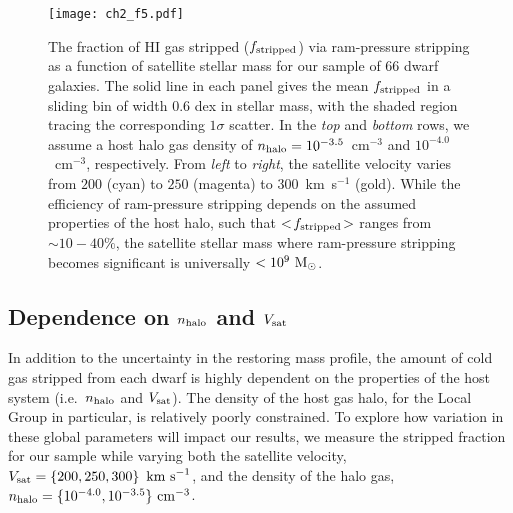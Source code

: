 
\begin{figure*}
 \centering
 \hspace*{-0.5in}
  \texttt{[image: ch2\_f5.pdf]}
  \caption{The fraction of H{\scriptsize I} gas stripped ($f_{\rm
      stripped}$) via ram-pressure %
    stripping as a function of satellite stellar mass for our sample
    of $66$ dwarf galaxies. The solid line in each panel gives the
    mean $f_{\rm stripped}$ in a sliding bin of width $0.6$ dex in
    stellar mass, with the shaded region tracing the corresponding
    $1\sigma$ scatter. In the \emph{top} and \emph{bottom} rows, we
    assume a host halo gas density of $n_{\rm
      halo}=10^{-3.5}$~cm$^{-3}$ and $10^{-4.0}$~cm$^{-3}$,
    respectively. From \emph{left} to \emph{right}, the satellite
    velocity varies from $200$ (cyan) to $250$ (magenta) to
    $300$~km~s$^{-1}$ (gold). While the efficiency of ram-pressure
    stripping depends on the assumed properties of the host halo, such
    that $<\!f_{\rm stripped}\!>$ ranges from $\sim10-40\%$, the
    satellite stellar mass where ram-pressure stripping becomes
    significant is universally $<10^{9}~{\rm M}_{\odot}$.}
 \label{fig:MW}
\end{figure*}


\subsection{Dependence on \boldmath$n_{\rm halo}$ and
  \boldmath$V_{\rm sat}$}
\label{subsec:drhoV}


In addition to the uncertainty in the restoring mass profile, the
amount of cold gas stripped from each dwarf is highly dependent on the
properties of the host system (i.e.~$n_{\rm halo}$ and $V_{\rm sat}$).
%
The density of the host gas halo, for the Local Group in particular,
is relatively poorly constrained. 
%
To explore how variation in these global parameters will impact our
results, we measure the stripped fraction for our sample while varying
both the satellite velocity, $V_{\rm sat} =\left \{200, 250, 300\right
\}~{\rm km~s}^{-1}$, and the density of the halo gas, $n_{\rm halo} =
\{10^{-4.0}, 10^{-3.5}\}~{\rm cm}^{-3}$.


